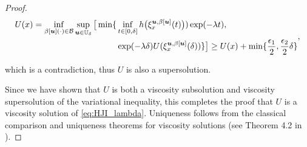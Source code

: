 \begin{for_journal}
\begin{proof}
\begin{equation} 
\begin{split}
U(x) = 
\inf_{\beta[\bm{u}](\cdot) \in \mathcal{B}} \sup_{\bm{u} \in \mathbb{U}_\delta} 
\big [\min\{ &\inf_{t \in [0, \delta]} h\big(\xi_{x}^{\bm{u},\beta[\bm{u}]}(t)\big))\exp(-\lambda  t), \\&\exp(-\lambda \delta)U(\xi_{x}^{\bm{u},\beta[\bm{u}]}(\delta))\}
\big ]\geq
U(x) + \min\{\frac{\epsilon_1}{2}, \frac{\epsilon_2}{2} \delta \}
\end{split},
\end{equation}
%

which is a contradiction, thus $U$ is also a supersolution.

Since we have shown that $U$ is both a viscosity subsolution and viscosity supersolution of the variational inequality, this completes the proof that $U$ is a viscosity solution of \eqref{eq:HJI_lambda}. Uniqueness follows from the classical comparison and uniqueness theorems for viscosity solutions (see Theorem 4.2 in \cite{Barron1989}).
\end{proof}
\end{for_journal}